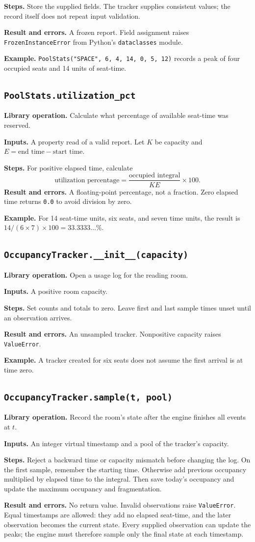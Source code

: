 \documentclass[11pt,a4paper]{article}
\newcommand{\routine}[2]{\subsection{\texorpdfstring{\texttt{#1}}{#2}}}
\newcommand{\librarymeaning}{\textbf{Library operation.} }
\newcommand{\arguments}{\textbf{Inputs.} }
\newcommand{\steps}{\textbf{Steps.} }
\newcommand{\result}{\textbf{Result and errors.} }
\newcommand{\example}{\textbf{Example.} }
\begin{document}
\steps Store the supplied fields. The tracker supplies consistent values;
the record itself does not repeat input validation.

\result A frozen report. Field assignment raises \texttt{FrozenInstanceError}
from Python's \texttt{dataclasses} module.

\example \texttt{PoolStats("SPACE", 6, 4, 14, 0, 5, 12)} records a peak
of four occupied seats and 14 units of seat-time.

\routine{PoolStats.utilization\_pct}{PoolStats utilization property}
\librarymeaning Calculate what percentage of available seat-time was reserved.

\arguments A property read of a valid report. Let $K$ be capacity and
$E=\text{end time}-\text{start time}$.

\steps For positive elapsed time, calculate
\[
\text{utilization percentage}=
\frac{\text{occupied integral}}{K E}\times100.
\]
\result A floating-point percentage, not a fraction. Zero elapsed time
returns \texttt{0.0} to avoid division by zero.

\example For 14 seat-time units, six seats, and seven time units,
the result is $14/(6\times7)\times100=33.3333\ldots\%$.

\routine{OccupancyTracker.\_\_init\_\_(capacity)}{OccupancyTracker constructor}
\librarymeaning Open a usage log for the reading room.

\arguments A positive room capacity.

\steps Set counts and totals to zero. Leave first and last sample times
unset until an observation arrives.

\result An unsampled tracker. Nonpositive capacity raises \texttt{ValueError}.

\example A tracker created for six seats does not assume the first arrival
is at time zero.

\routine{OccupancyTracker.sample(t, pool)}{OccupancyTracker sample}
\librarymeaning Record the room's state after the engine finishes all events at $t$.

\arguments An integer virtual timestamp and a pool of the tracker's capacity.

\steps Reject a backward time or capacity mismatch before changing the log.
On the first sample, remember the starting time. Otherwise add previous
occupancy multiplied by elapsed time to the integral. Then save today's
occupancy and update the maximum occupancy and fragmentation.

\result No return value. Invalid observations raise \texttt{ValueError}.
Equal timestamps are allowed: they add no elapsed seat-time, and the later
observation becomes the current state. Every supplied observation can update
the peaks; the engine must therefore sample only the final state at each timestamp.
\end{document}
